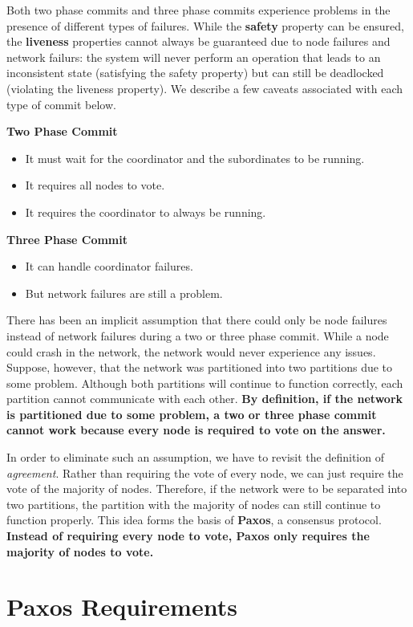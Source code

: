 \documentclass[twoside]{article}
\begin{document}
Both two phase commits and three phase commits experience problems in the presence of different types of failures. While the \textbf{safety} property can be ensured, the \textbf{liveness} properties cannot always be guaranteed due to node failures and network failurs: the system will never perform an operation that leads to an inconsistent state (satisfying the safety property) but can still be deadlocked (violating the liveness property). We describe a few caveats associated with each type of commit below.

\textbf{Two Phase Commit}
\begin{itemize}
    \item It must wait for the coordinator and the subordinates to be running.
    \item It requires all nodes to vote.
    \item It requires the coordinator to always be running.
\end{itemize}

\textbf{Three Phase Commit}
\begin{itemize}
    \item It can handle coordinator failures.
    \item But network failures are still a problem.
\end{itemize}

There has been an implicit assumption that there could only be node failures instead of network failures during a two or three phase commit. While a node could crash in the network, the network would never experience any issues. Suppose, however, that the network was partitioned into two partitions due to some problem. Although both partitions will continue to function correctly, each partition cannot communicate with each other. \textbf{By definition, if the network is partitioned due to some problem, a two or three phase commit cannot work because every node is required to vote on the answer.}

In order to eliminate such an assumption, we have to revisit the definition of \emph{agreement}. Rather than requiring the vote of every node, we can just require the vote of the majority of nodes. Therefore, if the network were to be separated into two partitions, the partition with the majority of nodes can still continue to function properly. This idea forms the basis of \textbf{Paxos}, a consensus protocol. \textbf{Instead of requiring every node to vote, Paxos only requires the majority of nodes to vote.}

\section{Paxos Requirements}
\end{document}

